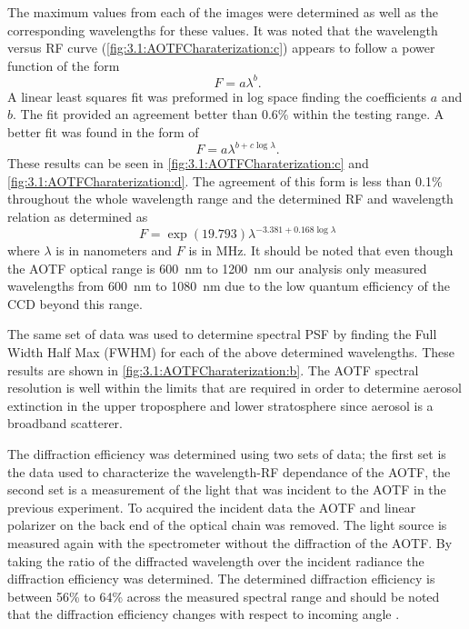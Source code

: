 \documentclass[12pt]{article}
\begin{document}
The maximum values from each of the images were determined as well as the corresponding wavelengths for these values. It was noted that the wavelength versus RF curve 
(\autoref{fig:3.1:AOTFCharaterization:c}) appears to follow a power function of the form
\begin{equation}
    \ F = a\lambda^{b}.
    \label{eqn:3.1:powerFunction}
\end{equation}
A linear least squares fit was preformed in log space finding the coefficients $a$ and $b$. The fit provided an agreement better than 0.6\% within the testing range. A better 
fit was found in the form of
 \begin{equation}
    \ F = a\lambda^{b+c\log\lambda}.
    \label{eqn:3.1:modifiedPowerFunction}
\end{equation}
These results can be seen in \autoref{fig:3.1:AOTFCharaterization:c} and \autoref{fig:3.1:AOTFCharaterization:d}. The agreement of this form is less than 0.1\% throughout the 
whole wavelength range and the determined RF and wavelength relation as determined as
\begin{equation}
    \ F = \exp{(19.793)}\lambda^{-3.381+0.168\log\lambda}
    \label{eqn:3.1:modifiedPowerFunctionCoeffiecicents}
\end{equation}
where $\lambda$ is in nanometers and $F$ is in MHz. It should be noted that even though the AOTF optical range is 600~nm to 1200~nm our analysis only measured wavelengths from 
600~nm to 1080~nm due to the low quantum efficiency of the CCD beyond this range.

The same set of data was used to determine spectral PSF by finding the Full Width Half Max (FWHM) for each of the above determined wavelengths. These results are shown in 
\autoref{fig:3.1:AOTFCharaterization:b}. The AOTF spectral resolution is well within the limits that are required in order to determine aerosol extinction in the upper 
troposphere and lower stratosphere since aerosol is a broadband scatterer.

The diffraction efficiency was determined using two sets of data; the first set is the data used to  characterize the wavelength-RF dependance of the AOTF, the second set is a 
measurement of the light that was incident to the AOTF in the previous experiment. To acquired the incident data the AOTF and linear polarizer on the back end of the optical 
chain was removed. The light source is measured again with the spectrometer without the diffraction of the AOTF. By taking the ratio of the diffracted wavelength over the 
incident radiance the diffraction efficiency was determined. The determined diffraction efficiency is between 56\% to 64\% across the measured spectral range and should be noted 
that the diffraction efficiency changes with respect to incoming angle \citep{Xu1992}.
\end{document}
